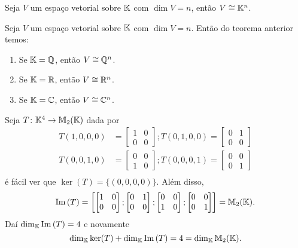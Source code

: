 \begin{teorema}
  Seja $V$ um espaço vetorial sobre $\mathbb{K}$  com $\dim V = n$, então $V \cong \mathbb{K}^n$.
\end{teorema}

\begin{observacoes}
  Seja $V$ um espaço vetorial sobre $\mathbb{K}$ com $\dim V = n$. Então do teorema anterior temos:
  \begin{enumerate}[label={\roman*})]
    \item Se $\mathbb{K} = \mathbb{Q}$, então $V \cong \mathbb{Q}^n$.

    \item Se $\mathbb{K} = \mathbb{R}$, então $V \cong \mathbb{R}^n$.

    \item Se $\mathbb{K} = \mathbb{C}$, então $V \cong \mathbb{C}^n$.
  \end{enumerate}
\end{observacoes}

\begin{exemplo}
  Seja $T \colon \mathbb{K}^4 \to \mathbb{M}_2(\mathbb{K})$ dada por
  \begin{align*}
    T(1,0,0,0) &= \begin{bmatrix}
      1 & 0\\
      0 & 0
    \end{bmatrix}; T(0,1,0,0) = \begin{bmatrix}
      0 & 1\\
      0 & 0
    \end{bmatrix}\\
    T(0,0,1,0) &= \begin{bmatrix}
      0 & 0\\
      1 & 0
    \end{bmatrix}; T(0,0,0,1) = \begin{bmatrix}
      0 & 0\\
      0 & 1
    \end{bmatrix}\\
  \end{align*}
  é fácil ver que $\ker(T) = \{(0,0,0,0)\}$. Além disso,
  \[
    {\rm Im\,}(T) = \left[\begin{bmatrix}
      1 & 0\\
      0 & 0
    \end{bmatrix};\begin{bmatrix}
      0 & 1\\
      0 & 0
    \end{bmatrix};\begin{bmatrix}
      0 & 0\\
      1 & 0
    \end{bmatrix};\begin{bmatrix}
      0 & 0\\
      0 & 1
    \end{bmatrix}\right] = \mathbb{M}_2(\mathbb{K}).
  \]
  Daí $\dim_{\mathbb{K}}{\rm Im\,}(T) = 4$ e novamente
  \[
    \dim_{\mathbb{K}}\ker(T) + \dim_{\mathbb{K}}{\rm Im\,}(T) = 4 = \dim_{\mathbb{K}}\mathbb{M}_2(\mathbb{K}).
  \]
\end{exemplo}

